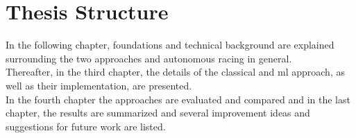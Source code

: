 \section{Thesis Structure}
In the following chapter, foundations and technical background are explained surrounding the two approaches and autonomous racing in general.\\
Thereafter, in the third chapter, the details of the classical and \ac{ml} approach, as well as their implementation, are presented.\\
In the fourth chapter the approaches are evaluated and compared
and in the last chapter, the results are summarized and several improvement ideas and suggestions for future work are listed.


